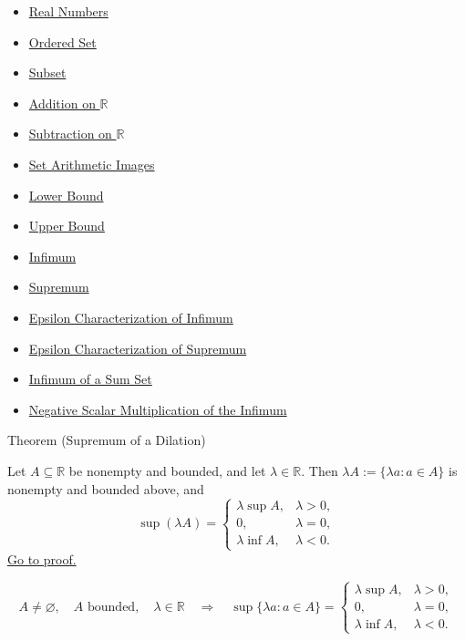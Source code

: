 \begin{dependencies}
\begin{itemize}
  \item \hyperref[def:reals]{Real Numbers}
  \item \hyperref[def:ordered-set]{Ordered Set}
  \item \hyperref[def:subset]{Subset}
  \item \hyperref[def:addition-on-r]{Addition on $\mathbb{R}$}
  \item \hyperref[def:subtraction-on-r]{Subtraction on $\mathbb{R}$}
  \item \hyperref[def:set-arithmetic-images]{Set Arithmetic Images}
  \item \hyperref[def:real-lower-bound]{Lower Bound}
  \item \hyperref[def:real-upper-bound]{Upper Bound}
  \item \hyperref[def:infimum]{Infimum}
  \item \hyperref[def:supremum]{Supremum}
  \item \hyperref[def:epsilon-characterization-of-infimum]{Epsilon Characterization of Infimum}
  \item \hyperref[def:epsilon-characterization-of-supremum]{Epsilon Characterization of Supremum}
  \item \hyperref[thm:infimum-sum-set]{Infimum of a Sum Set}
  \item \hyperref[thm:negative-scalar-mult-infimum]{Negative Scalar Multiplication of the Infimum}
\end{itemize}
\end{dependencies}


\begin{theorembox}{Theorem (Supremum of a Dilation)}
\begin{theorem}
\label{thm:supremum-dilation}
Let $A\subseteq\mathbb{R}$ be nonempty and bounded, and let
$\lambda\in\mathbb{R}$.  Then $\lambda A:=\{\lambda a:a\in A\}$ is nonempty
and bounded above, and
\[
  \sup(\lambda A)=
  \begin{cases}
    \lambda\sup A, & \lambda>0,\\
    0, & \lambda=0,\\
    \lambda\inf A, & \lambda<0.
  \end{cases}
\]
\hyperref[prf:supremum-dilation]{Go to proof.}
\end{theorem}
\end{theorembox}

\begin{remark*}
\[
A\neq\varnothing,\quad A\text{ bounded},\quad \lambda\in\mathbb{R}
\quad\Longrightarrow\quad
\sup\{\lambda a:a\in A\}=
\begin{cases}
  \lambda\sup A, & \lambda>0,\\
  0, & \lambda=0,\\
  \lambda\inf A, & \lambda<0.
\end{cases}
\]
\end{remark*}

